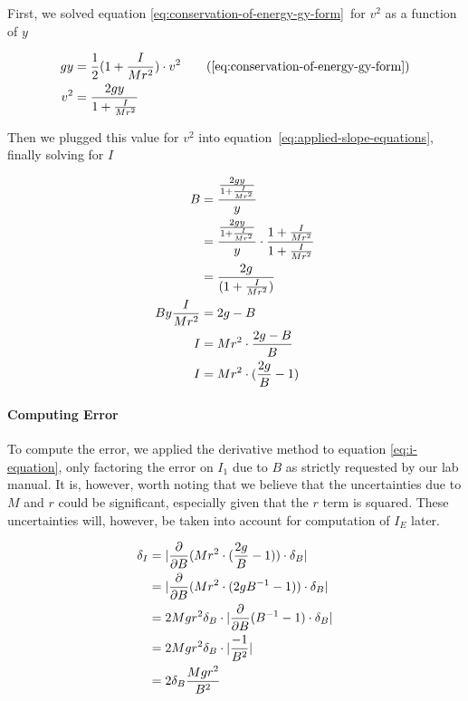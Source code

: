 \documentclass[coverpage]{article}
\begin{document}
	First, we solved equation \ref{eq:conservation-of-energy-gy-form}~for $v^2$ as a function of $y$
	
	\begin{align}
		gy &= \frac{1}{2}(1 + \frac{I}{Mr^2}) \cdot v^2 \tag{\ref{eq:conservation-of-energy-gy-form}} \\
		v^2 &= \frac{2gy}{1 + \frac{I}{Mr^2}}
	\end{align}
	
	Then we plugged this value for $v^2$ into equation~\ref{eq:applied-slope-equations}, finally solving for $I$
	
	\begin{align}
		B &= \frac{\frac{2gy}{1 + \frac{I}{Mr^2}}}{y} \notag \\
		&= \frac{\frac{2gy}{1 + \frac{I}{Mr^2}}}{y} \cdot \frac{1 + \frac{I}{Mr^2}}{1 + \frac{I}{Mr^2}} \notag \\
		&= \frac{2g}{(1 + \frac{I}{Mr^2})} \notag \\
		By\frac{I}{Mr^2} &= 2g - B \notag \\
		I &= Mr^2 \cdot \frac{2g - B}{B} \notag \\
		I &= Mr^2 \cdot (\frac{2g}{B} - 1) \label{eq:i-equation}
	\end{align}

	\paragraph{Computing Error}
	
	To compute the error, we applied the derivative method to equation \ref{eq:i-equation}, only factoring the error on $I_1$ due to $B$ as strictly requested by our lab manual. It is, however, worth noting that we believe that the uncertainties due to $M$ and $r$ could be significant, especially given that the $r$ term is squared. These uncertainties will, however, be taken into account for computation of $I_E$ later.
	
	\begin{align}
		\delta_I &= |\frac{\partial}{\partial B} (Mr^2 \cdot (\frac{2g}{B} - 1)) \cdot \delta_B| \notag \\
		&= |\frac{\partial}{\partial B} (Mr^2 \cdot (2g B^{-1} - 1)) \cdot \delta_B \notag| \notag \\
		&= 2 M g r^2 \delta_B \cdot |\frac{\partial}{\partial B} (B^{-1} - 1) \cdot \delta_B \notag| \notag \\
		&= 2 M g r^2 \delta_B \cdot |\frac{-1}{B^2}| \notag \\
		&= 2 \delta_B \frac{M g r^2}{B^2} \label{eq:delta-i-formula}
	\end{align}
\end{document}
